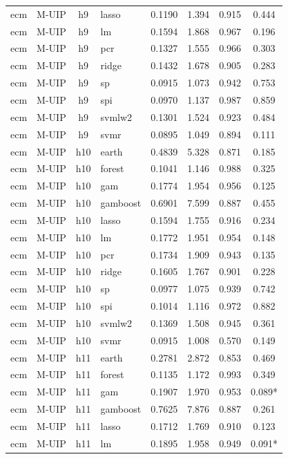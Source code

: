 \begin{ThreePartTable}
\begin{longtable}[t]{llclcccc}
ecm & M-UIP & h9 & lasso & 0.1190 & 1.394 & 0.915 & 0.444\\
ecm & M-UIP & h9 & lm & 0.1594 & 1.868 & 0.967 & 0.196\\
ecm & M-UIP & h9 & pcr & 0.1327 & 1.555 & 0.966 & 0.303\\
ecm & M-UIP & h9 & ridge & 0.1432 & 1.678 & 0.905 & 0.283\\
ecm & M-UIP & h9 & sp & 0.0915 & 1.073 & 0.942 & 0.753\\
ecm & M-UIP & h9 & spi & 0.0970 & 1.137 & 0.987 & 0.859\\
ecm & M-UIP & h9 & svmlw2 & 0.1301 & 1.524 & 0.923 & 0.484\\
ecm & M-UIP & h9 & svmr & 0.0895 & 1.049 & 0.894 & 0.111\\
\addlinespace
ecm & M-UIP & h10 & earth & 0.4839 & 5.328 & 0.871 & 0.185\\
ecm & M-UIP & h10 & forest & 0.1041 & 1.146 & 0.988 & 0.325\\
ecm & M-UIP & h10 & gam & 0.1774 & 1.954 & 0.956 & 0.125\\
ecm & M-UIP & h10 & gamboost & 0.6901 & 7.599 & 0.887 & 0.455\\
ecm & M-UIP & h10 & lasso & 0.1594 & 1.755 & 0.916 & 0.234\\
ecm & M-UIP & h10 & lm & 0.1772 & 1.951 & 0.954 & 0.148\\
ecm & M-UIP & h10 & pcr & 0.1734 & 1.909 & 0.943 & 0.135\\
ecm & M-UIP & h10 & ridge & 0.1605 & 1.767 & 0.901 & 0.228\\
ecm & M-UIP & h10 & sp & 0.0977 & 1.075 & 0.939 & 0.742\\
ecm & M-UIP & h10 & spi & 0.1014 & 1.116 & 0.972 & 0.882\\
ecm & M-UIP & h10 & svmlw2 & 0.1369 & 1.508 & 0.945 & 0.361\\
ecm & M-UIP & h10 & svmr & 0.0915 & 1.008 & 0.570 & 0.149\\
\addlinespace
ecm & M-UIP & h11 & earth & 0.2781 & 2.872 & 0.853 & 0.469\\
ecm & M-UIP & h11 & forest & 0.1135 & 1.172 & 0.993 & 0.349\\
ecm & M-UIP & h11 & gam & 0.1907 & 1.970 & 0.953 & 0.089*\\
ecm & M-UIP & h11 & gamboost & 0.7625 & 7.876 & 0.887 & 0.261\\
ecm & M-UIP & h11 & lasso & 0.1712 & 1.769 & 0.910 & 0.123\\
ecm & M-UIP & h11 & lm & 0.1895 & 1.958 & 0.949 & 0.091*\\

\end{longtable}
\end{ThreePartTable}
